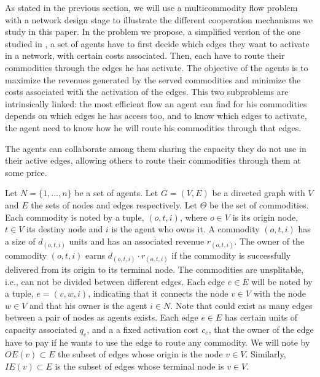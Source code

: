 \documentclass[review]{elsarticle}
\begin{document}
As stated in the previous section, we will use a multicommodity flow problem
with a network design stage to illustrate the different cooperation
mechanisms we study in this paper. In the problem we propose, a simplified version of the one studied in \citep{AGARWAL2008175}, a set of agents have
to first decide which edges they want to activate in a network, with certain
costs associated. Then, each have to route their commodities through the edges
he has activate. The objective of the agents is to maximize the revenues generated by the served commodities and minimize the costs associated with the activation of the edges. This two subproblems are intrinsically linked: the most efficient flow an agent can find for his commodities depends on which edges he has access too, and to know which edges to activate, the agent need to know how he will route his commodities through that edges. 

The agents can collaborate among them sharing the capacity they do not use in their active edges, allowing others to route their commodities through them at some price. 


Let $N=\{1,...,n\}$ be a set of agents. Let $G=(V,E)$ be a directed graph with
$V$ and $E$ the sets of nodes and edges respectively. 
Let $\Theta$ be the set of commodities. Each commodity is noted by a tuple,
$(o,t,i)$, where $o\in V$ is its origin node, $t\in V$ its destiny node and $i$
is the agent who owns it. A commodity $(o,t,i)$ has a size of $d_{(o,t,i)}$ units and has an associated revenue $r_{(o,t,i)}$. The owner of the commodity $(o,t,i)$ earns $d_(o,t,i)\cdot r_(o,t,i)$ if the commodity is successfully delivered from its origin to its terminal node. The commodities are unsplitable, i.e., can not be divided between different edges. Each edge $e \in E$ will be noted by a tuple, $e=(v,w,i)$, indicating that it connects the node $v\in V$
with the node $w \in V$ and that his owner is the agent $i\in N$. Note that
could exist as many edges between a pair of nodes as agents exists. Each edge $e
\in E$ has certain units of capacity associated $q_e$, and a a fixed activation
cost $c_e$, that the owner of the edge have to pay if he wants to use the edge to route any commodity. We will note by $OE(v)\subset E$ the subset of edges whose origin is the node $v\in V$. Similarly, $IE(v)\subset E$ is the subset of edges whose terminal node is $v\in V$.
\end{document}
